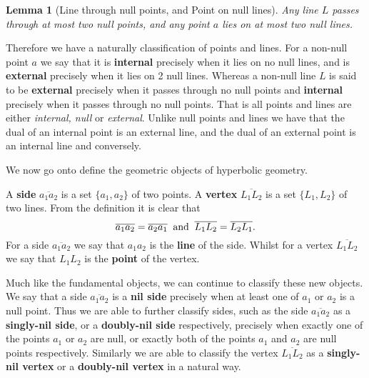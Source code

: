 \documentclass[11pt]{article}
\newtheorem{theorem}{Theorem}
\newtheorem{theorem}{Lemma}
\begin{document}
\begin{theorem}[Line through null points, and Point on null lines]
Any line $L$ passes through at most two null points, and any point $a$ lies
on at most two null lines.
\end{theorem}

Therefore we have a naturally classification of points and lines. For a
non-null point $a$ we say that it is \textbf{internal} precisely when it
lies on no null lines, and is \textbf{external} precisely when it lies on 2
null lines. Whereas a non-null line $L$ is said to be \textbf{external}
precisely when it passes through no null points and \textbf{internal}
precisely when it passes through no null points. That is all points and
lines are either \textit{internal, null} or \textit{external}.\newline
Unlike null points and lines we have that the dual of an internal point is
an external line, and the dual of an external point is an internal line and
conversely.

\pagebreak

We now go onto define the geometric objects of hyperbolic geometry.\newline

A \textbf{side} $\overline{a_{1}a_{2}}$ is a set $\{a_{1},a_{2}\}$ of two
points. A \textbf{vertex} $\overline{L_{1}L_{2}}$ is a set $\{L_{1},L_{2}\}$
of two lines. From the definition it is clear that 
\begin{equation*}
\overline{a_{1}a_{2}}=\overline{a_{2}a_{1}}\;\; \text{and}\;\;\overline{%
L_{1}L_{2}}=\overline{L_{2}L_{1}}.
\end{equation*}
For a side $\overline{a_{1}a_{2}}$ we say that $a_{1}a_{2}$ is the \textbf{%
line} of the side. Whilst for a vertex $\overline{L_{1}L_{2}}$ we say that $%
L_{1}L_{2}$ is the \textbf{point} of the vertex.\newline

Much like the fundamental objects, we can continue to classify these new
objects. We say that a side $\overline{a_{1}a_{2}}$ is a \textbf{nil side}
precisely when at least one of $a_{1}$ or $a_{2}$ is a null point. Thus we
are able to further classify sides, such as the side $\overline{a_{1}a_{2}}$
as a \textbf{singly-nil side}, or a \textbf{doubly-nil side} respectively,
precisely when exactly one of the points $a_{1}$ or $a_{2}$ are null, or
exactly both of the points $a_{1}$ and $a_{2}$ are null points respectively.
Similarly we are able to classify the vertex $\overline{L_{1}L_{2}}$ as a 
\textbf{singly-nil vertex} or a \textbf{doubly-nil vertex} in a natural way.%
\newline
\end{document}
